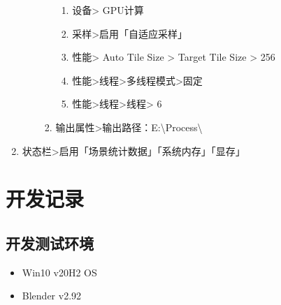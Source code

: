 \documentclass{../../PublicResources/DocClass}
\begin{document}
\begin{enumerate}
\begin{enumerate}
\begin{enumerate}
\begin{enumerate}
                    \item 设备> GPU计算
                    \item 采样>启用「自适应采样」
                    \item 性能> Auto Tile Size > Target Tile Size > 256
                    \item 性能>线程>多线程模式>固定
                    \item 性能>线程>线程> 6
                \end{enumerate}
                \item 输出属性>输出路径：E:\textbackslash Process\textbackslash
            \end{enumerate}
        \end{enumerate}
        \item 状态栏>启用「场景统计数据」「系统内存」「显存」
    \end{enumerate}

    \section{开发记录}
    \subsection{开发测试环境}
    \begin{itemize}
        \item Win10 v20H2 OS
        \item Blender v2.92
    \end{itemize}
\end{document}
